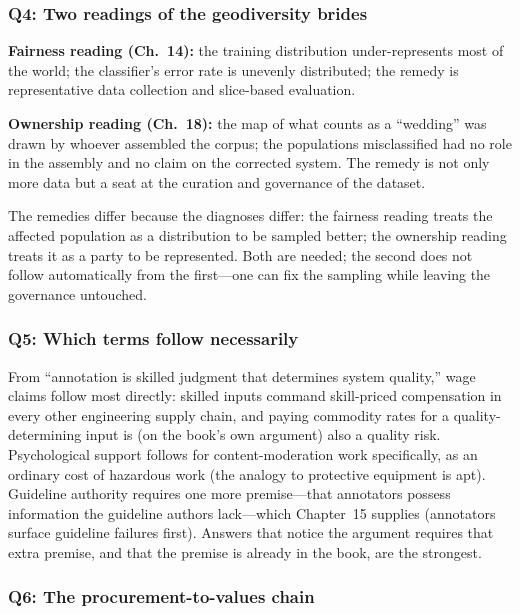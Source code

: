 \subsubsection*{Q4: Two readings of the geodiversity brides}

\textbf{Fairness reading (Ch.~14):} the training distribution under-represents most of the world; the classifier's error rate is unevenly distributed; the remedy is representative data collection and slice-based evaluation.

\textbf{Ownership reading (Ch.~18):} the map of what counts as a ``wedding'' was drawn by whoever assembled the corpus; the populations misclassified had no role in the assembly and no claim on the corrected system. The remedy is not only more data but a seat at the curation and governance of the dataset.

The remedies differ because the diagnoses differ: the fairness reading treats the affected population as a distribution to be sampled better; the ownership reading treats it as a party to be represented. Both are needed; the second does not follow automatically from the first---one can fix the sampling while leaving the governance untouched.

\subsubsection*{Q5: Which terms follow necessarily}

From ``annotation is skilled judgment that determines system quality,'' wage claims follow most directly: skilled inputs command skill-priced compensation in every other engineering supply chain, and paying commodity rates for a quality-determining input is (on the book's own argument) also a quality risk. Psychological support follows for content-moderation work specifically, as an ordinary cost of hazardous work (the analogy to protective equipment is apt). Guideline authority requires one more premise---that annotators possess information the guideline authors lack---which Chapter~15 supplies (annotators surface guideline failures first). Answers that notice the argument requires that extra premise, and that the premise is already in the book, are the strongest.

\subsubsection*{Q6: The procurement-to-values chain}

